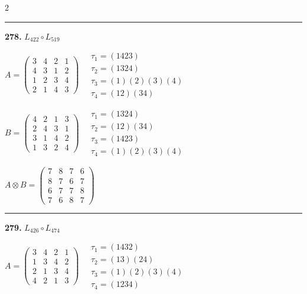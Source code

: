 \begin{multicols}{2}
\vspace{0.3em}
\hrule
\vspace{0.3em}

\noindent\textbf{278.} $L_{422} \circ L_{519}$

$A = \begin{pmatrix} 3 & 4 & 2 & 1 \\ 4 & 3 & 1 & 2 \\ 1 & 2 & 3 & 4 \\ 2 & 1 & 4 & 3 \end{pmatrix} \quad \begin{matrix} \tau_{1}=(1 4 2 3) \\ \tau_{2}=(1 3 2 4) \\ \tau_{3}=(1)(2)(3)(4) \\ \tau_{4}=(1 2)(3 4) \end{matrix}$

$B = \begin{pmatrix} 4 & 2 & 1 & 3 \\ 2 & 4 & 3 & 1 \\ 3 & 1 & 4 & 2 \\ 1 & 3 & 2 & 4 \end{pmatrix} \quad \begin{matrix} \tau_{1}=(1 3 2 4) \\ \tau_{2}=(1 2)(3 4) \\ \tau_{3}=(1 4 2 3) \\ \tau_{4}=(1)(2)(3)(4) \end{matrix}$

$A \otimes B = \begin{pmatrix} 7 & 8 & 7 & 6 \\ 8 & 7 & 6 & 7 \\ 6 & 7 & 7 & 8 \\ 7 & 6 & 8 & 7 \end{pmatrix}$

\vspace{0.3em}
\hrule
\vspace{0.3em}

\noindent\textbf{279.} $L_{426} \circ L_{474}$

$A = \begin{pmatrix} 3 & 4 & 2 & 1 \\ 1 & 3 & 4 & 2 \\ 2 & 1 & 3 & 4 \\ 4 & 2 & 1 & 3 \end{pmatrix} \quad \begin{matrix} \tau_{1}=(1 4 3 2) \\ \tau_{2}=(1 3)(2 4) \\ \tau_{3}=(1)(2)(3)(4) \\ \tau_{4}=(1 2 3 4) \end{matrix}$


\end{multicols}
